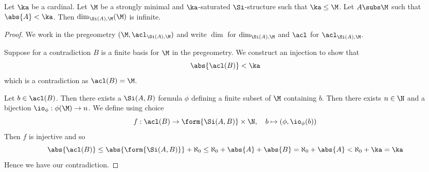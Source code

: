 \begin{lem}
    Let $\ka$ be a cardinal.
    Let $\M$ be a strongly minimal and $\ka$-saturated $\Si$-structure
    such that $\ka \leq \M$.
    Let $A \subs \M$ such that $\abs{A} < \ka$.
    Then $\dim_{\Si(A),\M}(\M)$ is infinite.
\end{lem}
\begin{proof}
    We work in the pregeometry $(\M,\acl_{\Si(A),\M})$ and write 
    $\dim$ for $\dim_{\Si(A),\M}$ and $\acl$ for $\acl_{\Si(A),\M}$.
    
    Suppose for a contradiction $B$ is a finite basis for $\M$ 
    in the pregeometry.
    We construct an injection to show that 
    \[\abs{\acl(B)} < \ka\]
    which is a contradiction as $\acl(B) = \M$.

    Let $b \in \acl(B)$. 
    Then there exists a $\Si(A,B)$ formula $\phi$ defining a finite subset of 
    $\M$ containing $b$.
    Then there exists $n \in \N$ and a bijection $\io_\phi : \phi(\M) \to n$.
    We define using choice
    \[
        f : \acl(B) \to \form{\Si(A,B)} \times \N, 
        \quad b \mapsto (\phi,\io_\phi(b))
    \]
    Then $f$ is injective and so 
    \[
        \abs{\acl(B)} \leq 
        \abs{\form{\Si(A,B)}} + \aleph_0 \leq 
        \aleph_0 + \abs{A} + \abs{B} = \aleph_0 + \abs{A}
        < \aleph_0 + \ka = \ka
    \]
    Hence we have our contradiction.
\end{proof}

